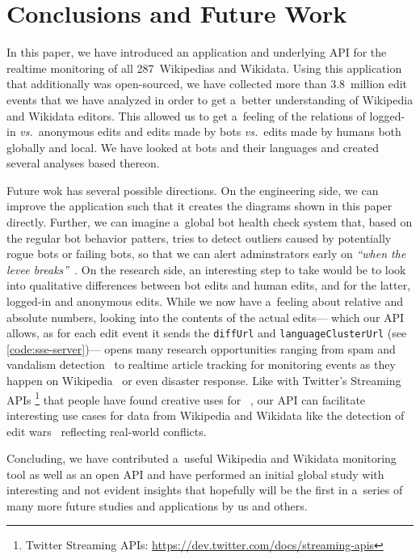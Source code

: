 \documentclass{sig-alternate}
\newcommand{\inlinelistingsize}{\fontsize{8pt}{11pt}}
\let\oldurl\url
\renewcommand{\url}[1]{\inlinelistingsize\oldurl{#1}}
\begin{document}
\section{Conclusions and Future Work}

In this paper, we have introduced an application
and underlying API for the realtime monitoring
of all 287~Wikipedias and Wikidata.
Using this application that additionally was open-sourced,
we have collected more than 3.8~million edit events
that we have analyzed in order to get a~better understanding
of Wikipedia and Wikidata editors.
This allowed us to get a~feeling of the relations of
logged-in \emph{vs.}\ anonymous edits
and edits made by bots \emph{vs.}\ edits made by humans
both globally and local.
We have looked at bots and their languages
and created several analyses based thereon.

Future wok has several possible directions.
On the engineering side, we can improve the application
such that it creates the diagrams shown in this paper directly.
Further, we can imagine a~global bot health check system
that, based on the regular bot behavior patters,
tries to detect outliers caused by
potentially rogue bots or failing bots,
so that we can alert adminstrators early on
\textit{``when the levee breaks''}~\cite{geiger2013withoutbots}.
On the research side, an interesting step to take
would be to look into qualitative differences
between bot edits and human edits, and for the latter,
logged-in and anonymous edits.
While we now have a~feeling about relative and absolute numbers,
looking into the contents of the actual edits---%
which our API allows, as for each edit event it sends the
\texttt{diffUrl} and \texttt{languageClusterUrl}
(see \autoref{code:sse-server})---%
opens many research opportunities ranging from spam
and vandalism detection~\cite{alfonseca2013spam}
to realtime article tracking for monitoring events
as they happen on Wikipedia~\cite{steiner2013mjnomore}
or even disaster response.
Like with Twitter's Streaming APIs%
\footnote{Twitter Streaming APIs:
\url{https://dev.twitter.com/docs/streaming-apis}}
that people have found creative uses for%
~\cite{petrovic2010streamingfirststory},
our API can facilitate interesting use cases
for data from Wikipedia and Wikidata like the detection of
edit wars~\cite{yasseri2012conflicts}
reflecting real-world conflicts.

Concluding, we have contributed a~useful
Wikipedia and Wikidata monitoring tool
as well as an open API
and have performed an initial global study 
with interesting and not evident insights that
hopefully will be the first in a~series
of many more future studies and applications by us
and others.
 


\balancecolumns
\end{document}
